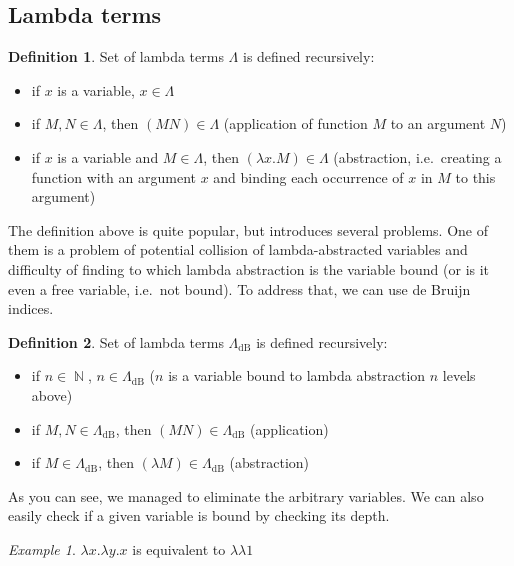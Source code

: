 \documentclass[final]{article}
\theoremstyle{definition}
\newtheorem{definition}{Definition}[subsection]
\theoremstyle{remark}
\newtheorem{example}{Example}[subsection]
\newcommand{\LambdadB}{\ensuremath{\Lambda_{\text{dB}}}}
\DeclareMathOperator{\N}{\mathbb{N}}
\begin{document}
\subsection{Lambda terms}%
\label{sub:lambda_terms}

\begin{definition}
    Set of lambda terms \(\Lambda\) is defined recursively:
    \begin{itemize}
        \item if \(x\) is a variable, \(x \in \Lambda\)
        \item if \(M, N \in \Lambda\), then \((M N) \in \Lambda\) (application of function \(M\) to an argument \(N\))
        \item if \(x\) is a variable and \(M \in \Lambda\), then \((\lambda x . M) \in \Lambda\) (abstraction, i.e.\ creating a function with an argument \(x\) and binding each occurrence of \(x\) in \(M\) to this argument)
    \end{itemize}
\end{definition}

The definition above is quite popular, but introduces several problems. One of them is a problem of potential collision of lambda-abstracted variables and difficulty of finding to which lambda abstraction is the variable bound (or is it even a free variable, i.e.\ not bound). To address that, we can use de Bruijn indices.

\begin{definition}
    Set of lambda terms \(\LambdadB\) is defined recursively:
    \begin{itemize}
        \item if \(n \in \N\), \(n \in \LambdadB\) (\(n\) is a variable bound to lambda abstraction \(n\) levels above)
        \item if \(M, N \in \LambdadB\), then \((M N) \in \LambdadB\) (application)
        \item if \(M \in \LambdadB\), then \((\lambda M) \in \LambdadB\) (abstraction)
    \end{itemize}
\end{definition}

As you can see, we managed to eliminate the arbitrary variables. We can also easily check if a given variable is bound by checking its depth.

\begin{example}
    \(\lambda x . \lambda y . x\) is equivalent to \(\lambda \lambda 1\)
\end{example}
\end{document}
